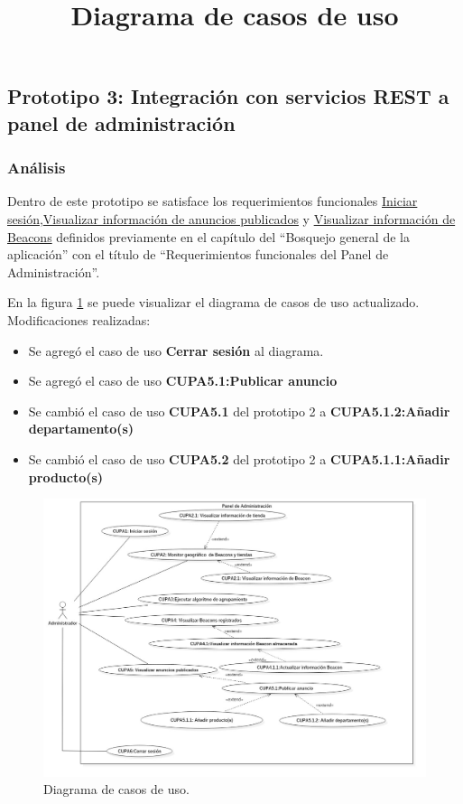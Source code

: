 \subsection{Prototipo 3: Integración con servicios REST a panel de administración}

\subsubsection{Análisis}

Dentro de este prototipo se satisface los requerimientos funcionales \hyperlink{RFPA}{Iniciar sesión},\hyperlink{RFPA}{Visualizar información de anuncios publicados} y \hyperlink{RFPA}{Visualizar información de Beacons} definidos previamente en el capítulo del ``Bosquejo general de la aplicación''  con el título de ``Requerimientos funcionales del Panel de Administración''. \\ \par

\title{\textbf{Diagrama de casos de uso \\}}
En la figura \ref{casosusomiddleware2} se puede visualizar el diagrama de casos de uso actualizado. \\
Modificaciones realizadas: 
\begin{itemize}
\item Se agregó el caso de uso \textbf{Cerrar sesión} al diagrama.
\item Se agregó el caso de uso \textbf{CUPA5.1:Publicar anuncio}
\item Se cambió el caso de uso \textbf{CUPA5.1}  del prototipo 2 a \textbf{CUPA5.1.2:Añadir departamento(s)}
\item Se cambió el caso de uso  \textbf{CUPA5.2} del prototipo 2 a \textbf{CUPA5.1.1:Añadir producto(s)}
\end{itemize}
 
\FloatBarrier
\begin{figure}[htbp!]
		\centering
			\includegraphics[width=1.1 \textwidth]{imagenes/CU/middleware2}
		\caption{Diagrama de casos de uso.}
		\label{casosusomiddleware2}
\end{figure}
\FloatBarrier


